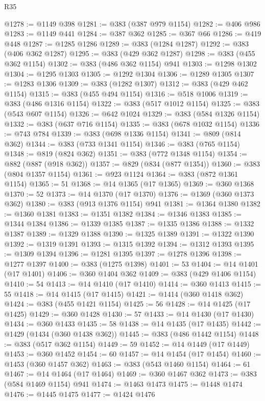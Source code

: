 \begin{lexlean}{R35}
\begin{coremodule}
@1278 := @1149 @398
@1281 := @383 (@387 @979 @1154)
@1282 := @406 @986
@1283 := @1149 @441
@1284 := @387 @362
@1285 := @367 @66
@1286 := @419 @448
@1287 := @1285 @1286
@1289 := @383 (@1284 @1287)
@1292 := @383 (@406 @362 @1287)
@1295 := @383 (@429 @362 @1287)
@1298 := @383 (@455 @362 @1154)
@1302 := @383 (@486 @362 @1154) @941
@1303 := @1298 @1302
@1304 := @1295 @1303
@1305 := @1292 @1304
@1306 := @1289 @1305
@1307 := @1283 @1306
@1309 := @383 (@1282 @1307)
@1312 := @383 (@429 @462 @1154)
@1315 := @383 (@455 @494 @1154)
@1316 := @518 @1006
@1319 := @383 (@486 @1316 @1154)
@1322 := @383 (@517 @1012 @1154)
@1325 := @383 (@543 @607 @1154)
@1326 := @642 @1024
@1329 := @383 (@584 @1326 @1154)
@1332 := @383 (@637 @716 @1154)
@1335 := @383 (@678 @1032 @1154)
@1336 := @743 @784
@1339 := @383 (@698 @1336 @1154)
@1341 := @809 (@814 @362)
@1344 := @383 (@733 @1341 @1154)
@1346 := @383 (@765 @1154)
@1348 := @819 (@824 @362)
@1351 := @383 (@772 @1348 @1154)
@1354 := @882 (@887 (@918 @362))
@1357 := @829 (@834 (@877 @1354))
@1360 := @383 (@804 @1357 @1154)
@1361 := @923 @1124
@1364 := @383 (@872 @1361 @1154)
@1365 := 51
@1368 := @14 @1365 (@17 @1365)
@1369 := @360 @1368
@1370 := 52
@1373 := @14 @1370 (@17 @1370)
@1376 := @1369 (@360 @1373 @362)
@1380 := @383 (@913 @1376 @1154) @941
@1381 := @1364 @1380
@1382 := @1360 @1381
@1383 := @1351 @1382
@1384 := @1346 @1383
@1385 := @1344 @1384
@1386 := @1339 @1385
@1387 := @1335 @1386
@1388 := @1332 @1387
@1389 := @1329 @1388
@1390 := @1325 @1389
@1391 := @1322 @1390
@1392 := @1319 @1391
@1393 := @1315 @1392
@1394 := @1312 @1393
@1395 := @1309 @1394
@1396 := @1281 @1395
@1397 := @1278 @1396
@1398 := @1277 @1397
@1400 := @383 (@1275 @1398)
@1401 := 53
@1404 := @14 @1401 (@17 @1401)
@1406 := @360 @1404 @362
@1409 := @383 (@429 @1406 @1154)
@1410 := 54
@1413 := @14 @1410 (@17 @1410)
@1414 := @360 @1413
@1415 := 55
@1418 := @14 @1415 (@17 @1415)
@1421 := @1414 (@360 @1418 @362)
@1424 := @383 (@455 @1421 @1154)
@1425 := 56
@1428 := @14 @1425 (@17 @1425)
@1429 := @360 @1428
@1430 := 57
@1433 := @14 @1430 (@17 @1430)
@1434 := @360 @1433
@1435 := 58
@1438 := @14 @1435 (@17 @1435)
@1442 := @1429 (@1434 (@360 @1438 @362))
@1445 := @383 (@486 @1442 @1154)
@1448 := @383 (@517 @362 @1154)
@1449 := 59
@1452 := @14 @1449 (@17 @1449)
@1453 := @360 @1452
@1454 := 60
@1457 := @14 @1454 (@17 @1454)
@1460 := @1453 (@360 @1457 @362)
@1463 := @383 (@543 @1460 @1154)
@1464 := 61
@1467 := @14 @1464 (@17 @1464)
@1469 := @360 @1467 @362
@1473 := @383 (@584 @1469 @1154) @941
@1474 := @1463 @1473
@1475 := @1448 @1474
@1476 := @1445 @1475
@1477 := @1424 @1476

\end{coremodule}
\end{lexlean}
